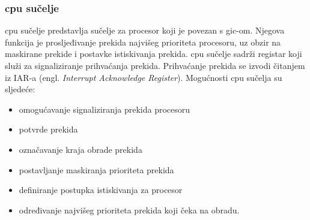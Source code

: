 \documentclass[times, utf8, diplomski, numeric]{fer}
\begin{document}
\subsubsection{\gls{cpu} sučelje}
\gls{cpu} sučelje predstavlja sučelje za procesor koji je povezan s \gls{gic}-om. Njegova funkcija je prosljeđivanje prekida najvišeg
prioriteta procesoru, uz obzir na maskirane prekide i postavke istiskivanja prekida. \gls{cpu} sučelje sadrži registar koji
služi za signaliziranje prihvaćanja prekida. Prihvaćanje prekida se izvodi čitanjem iz IAR-a (engl. \textit{Interrupt
Acknowledge Register}). Mogućnosti \gls{cpu} sučelja su sljedeće:
\begin{itemize}
  \item{omogućavanje signaliziranja prekida procesoru}
  \item{potvrde prekida}
  \item{označavanje kraja obrade prekida}
  \item{postavljanje maskiranja prioriteta prekida}
  \item{definiranje postupka istiskivanja za procesor}
  \item{određivanje najvišeg prioriteta prekida koji čeka na obradu.}
\end{itemize}
\end{document}
